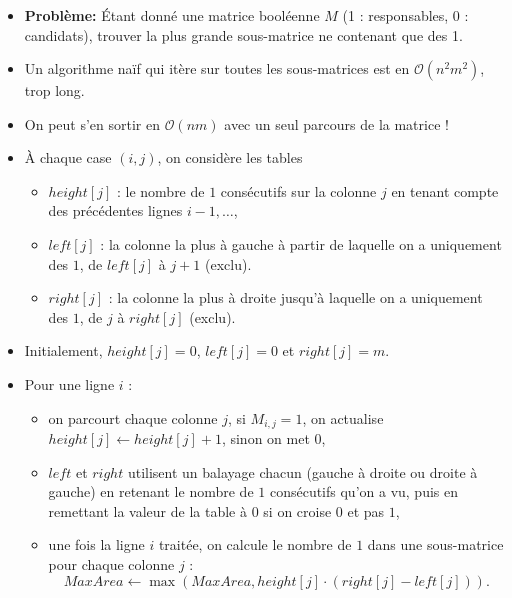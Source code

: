\begin{frame}
    \frametitle{\problemtitle}
    \begin{itemize}
        \item<+-> \textbf{Problème:} Étant donné une matrice booléenne $M$ (1 : responsables, 0 : candidats), trouver la plus grande sous-matrice ne contenant que des 1.
        \item<+-> Un algorithme naïf qui itère sur toutes les sous-matrices est en $\mathcal{O}(n^2m^2)$, trop long.
        \item<+-> On peut s'en sortir en $\mathcal{O}(nm)$ avec un seul parcours de la matrice !
        \item<+-> À chaque case $(i,j)$, on considère les tables
                  \begin{itemize}
                     \item $height[j]$ : le nombre de $1$ consécutifs sur la colonne $j$ en tenant compte des précédentes lignes $i-1,\dots$,
                     \item $left[j]$ : la colonne la plus à gauche à partir de laquelle on a uniquement des $1$, de $left[j]$ à $j+1$ (exclu).
                     \item $right[j]$ : la colonne la plus à droite jusqu'à laquelle on a uniquement des $1$, de $j$ à $right[j]$ (exclu).
                  \end{itemize}
        \item<+-> Initialement, $height[j]=0$, $left[j]=0$ et $right[j]=m$.
        \item<+-> Pour une ligne $i$ :
          \begin{itemize}
             \item on parcourt chaque colonne $j$, si $M_{i,j}=1$, on actualise $height[j]\leftarrow height[j]+1$, sinon on met $0$,
             \item $left$ et $right$ utilisent un balayage chacun (gauche à droite ou droite à gauche) en retenant le nombre de $1$ consécutifs qu'on a vu, puis en remettant la valeur de la table à $0$ si on croise $0$ et pas $1$,
             \item<+-> une fois la ligne $i$ traitée, on calcule le nombre de $1$ dans une sous-matrice pour chaque colonne $j$ : \[MaxArea \leftarrow \max(MaxArea, height[j]\cdot (right[j]-left[j])).\]
          \end{itemize}
    \end{itemize}
\end{frame}


    \solvestats
